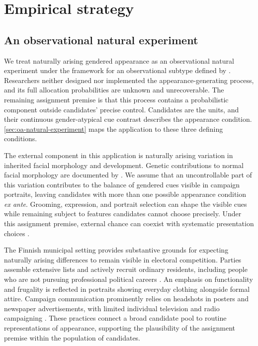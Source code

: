 \documentclass[11pt,a4paper]{article}\usepackage[]{graphicx}\usepackage[]{xcolor}
\begin{document}
\section{Empirical strategy}
\label{sec:strategy}
\subsection{An observational natural experiment}
\label{sec:natural-experiment}
We treat naturally arising gendered appearance as an observational natural experiment under the framework for an observational subtype defined by \textcite[118--119]{Titiunik2021}. Researchers neither designed nor implemented the appearance-generating process, and its full allocation probabilities are unknown and unrecoverable. The remaining assignment premise is that this process contains a probabilistic component outside candidates' precise control. Candidates are the units, and their continuous gender-atypical cue contrast describes the appearance condition. \autoref{sec:oa-natural-experiment} maps the application to these three defining conditions.

The external component in this application is naturally arising variation in inherited facial morphology and development. Genetic contributions to normal facial morphology are documented by \textcite{LiuEtAl2012}. We assume that an uncontrollable part of this variation contributes to the balance of gendered cues visible in campaign portraits, leaving candidates with more than one possible appearance condition \emph{ex ante}. Grooming, expression, and portrait selection can shape the visible cues while remaining subject to features candidates cannot choose precisely. Under this assignment premise, external chance can coexist with systematic presentation choices \parencite[118--119]{Titiunik2021}.

The Finnish municipal setting provides substantive grounds for expecting naturally arising differences to remain visible in electoral competition. Parties assemble extensive lists and actively recruit ordinary residents, including people who are not pursuing professional political careers \parencite[628]{Bahamonde2024}. An emphasis on functionality and frugality is reflected in portraits showing everyday clothing alongside formal attire. Campaign communication prominently relies on headshots in posters and newspaper advertisements, with limited individual television and radio campaigning \parencite[628--629]{Bahamonde2024} \parencite[80,83]{BerggrenEtAl2017}. These practices connect a broad candidate pool to routine representations of appearance, supporting the plausibility of the assignment premise within the population of candidates.
\end{document}
